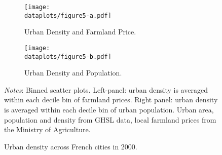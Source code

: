 \documentclass[./20250130-paper.tex]{subfiles}
\begin{document}















\begin{figure}[h!]
	\begin{subfigure}{0.5\textwidth}
		\texttt{[image: \\dataplots/figure5-a.pdf]}
		\caption{Urban Density and Farmland Price.\label{fig:cross-section-density-price}}
	\end{subfigure}%
	\hspace{5mm}
	\begin{subfigure}{0.5\textwidth}
		\texttt{[image: \\dataplots/figure5-b.pdf]}
		\caption{Urban Density and Population.\label{fig:cross-section-density-pop}}
	\end{subfigure}
	\caption{Urban density across French cities in 2000.}
	{\footnotesize \textit{Notes}: Binned scatter plots. Left-panel: urban density is averaged within each decile bin of farmland prices. Right panel: urban density is averaged within each decile bin of urban population. Urban area, population and density from GHSL data, local farmland prices from the Ministry of Agriculture.}
\end{figure}
\end{document}
